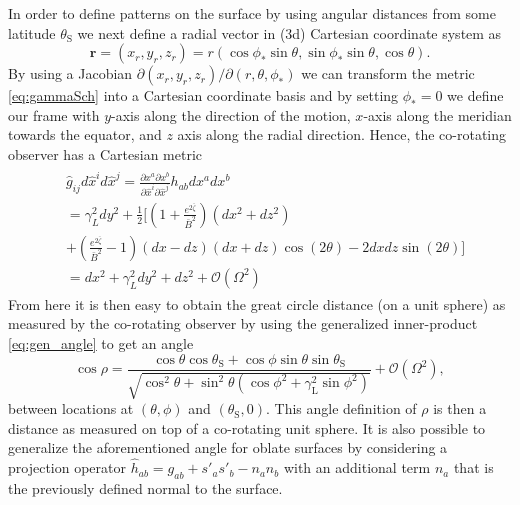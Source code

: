 \documentclass[iop, usenatbib]{emulateapj}
\newcommand{\be}{\begin{equation}}
\newcommand{\ee}{\end{equation}}
\renewcommand{\vec}[1]{\ensuremath{\boldsymbol{#1}}​}
\newcommand{\zetab}{\ensuremath{\bar{\zeta}}}
\newcommand{\Bb}{\ensuremath{\bar{B}}}
\begin{document}
In order to define patterns on the surface by using angular distances from some latitude $\theta_{\mathrm{S}}$ we next define a radial vector in (3d) Cartesian coordinate system as
\be
\vec{r} = (x_r, y_r, z_r) = r (\cos\phi_* \sin\theta, \sin\phi_* \sin\theta, \cos\theta).
\ee
By using a Jacobian $\partial(x_r, y_r, z_r)/\partial (r, \theta, \phi_*)$ we can transform the metric \eqref{eq:gammaSch} into a Cartesian coordinate basis and by setting $\phi_*=0$ we define our frame with $y$-axis along the direction of the motion, $x$-axis along the meridian towards the equator, and $z$ axis along the radial direction.
Hence, the co-rotating observer has a Cartesian metric
\begin{align}\begin{split}
& \hat{g}_{ij} d\hat{x}^i d\hat{x}^j = \frac{\partial x^a \partial x^b}{\partial \hat{x}^i \partial \hat{x}^j} h_{ab} dx^a dx^b  \\
&= \gamma_L^2 dy^2 + \frac{1}{2} [ (1+ \frac{e^{2\zetab}}{\Bb^2})(dx^2 + dz^2) \\
&+ (\frac{e^{2\zetab}}{\Bb^2} - 1)(dx-dz)(dx + dz) \cos(2\theta) - 2dx dz \sin(2\theta) ] \\
& = dx^2 + \gamma_L^2 dy^2 + dz^2 + \mathcal{O}(\Omega^2)
\end{split}\end{align}
From here it is then easy to obtain the great circle distance (on a unit sphere) as measured by the co-rotating observer by using the generalized inner-product \eqref{eq:gen_angle} to get an angle
\be\label{eq:rel_cos}
\cos\rho = \frac{\cos\theta \cos\theta_\mathrm{S} + \cos\phi \sin\theta \sin\theta_{\mathrm{S}}}{\sqrt{ \cos^2\theta + \sin^2\theta (\cos\phi^2 + \gamma_{\mathrm{L}}^2 \sin\phi^2)}} + \mathcal{O}(\Omega^2), 
\ee
between locations at $(\theta, \phi)$ and $(\theta_{\mathrm{S}}, 0)$.
This angle definition of $\rho$ is then a distance as measured on top of a co-rotating unit sphere.
It is also possible to generalize the aforementioned angle for oblate surfaces by considering a projection operator $\hat{h}_{ab} = g_{ab} + s'_a s'_b - n_a n_b$ with an additional term $n_a$ that is the previously defined normal to the surface.
\end{document}
